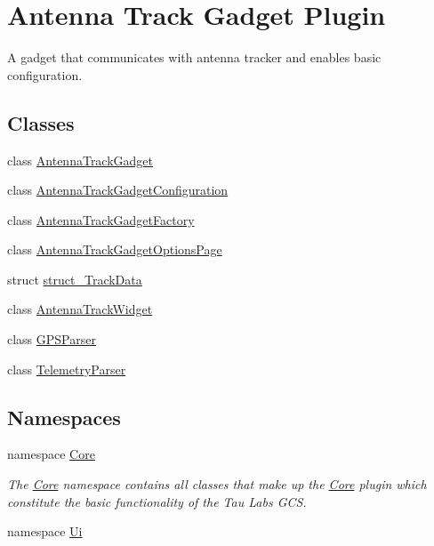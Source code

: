 \hypertarget{group___antenna_track_gadget_plugin}{\section{\-Antenna \-Track \-Gadget \-Plugin}
\label{group___antenna_track_gadget_plugin}
}


\-A gadget that communicates with antenna tracker and enables basic configuration.  


\subsection*{\-Classes}
\begin{DoxyCompactItemize}
\item 
class \hyperlink{class_antenna_track_gadget}{\-Antenna\-Track\-Gadget}
\item 
class \hyperlink{class_antenna_track_gadget_configuration}{\-Antenna\-Track\-Gadget\-Configuration}
\item 
class \hyperlink{class_antenna_track_gadget_factory}{\-Antenna\-Track\-Gadget\-Factory}
\item 
class \hyperlink{class_antenna_track_gadget_options_page}{\-Antenna\-Track\-Gadget\-Options\-Page}
\item 
struct \hyperlink{structstruct___track_data}{struct\-\_\-\-Track\-Data}
\item 
class \hyperlink{class_antenna_track_widget}{\-Antenna\-Track\-Widget}
\item 
class \hyperlink{class_g_p_s_parser}{\-G\-P\-S\-Parser}
\item 
class \hyperlink{class_telemetry_parser}{\-Telemetry\-Parser}
\end{DoxyCompactItemize}
\subsection*{\-Namespaces}
\begin{DoxyCompactItemize}
\item 
namespace \hyperlink{namespace_core}{\-Core}
\begin{DoxyCompactList}\small\item\em \-The \hyperlink{namespace_core}{\-Core} namespace contains all classes that make up the \hyperlink{namespace_core}{\-Core} plugin which constitute the basic functionality of the \-Tau \-Labs \-G\-C\-S. \end{DoxyCompactList}\item 
namespace \hyperlink{namespace_ui}{\-Ui}
\end{DoxyCompactItemize}
